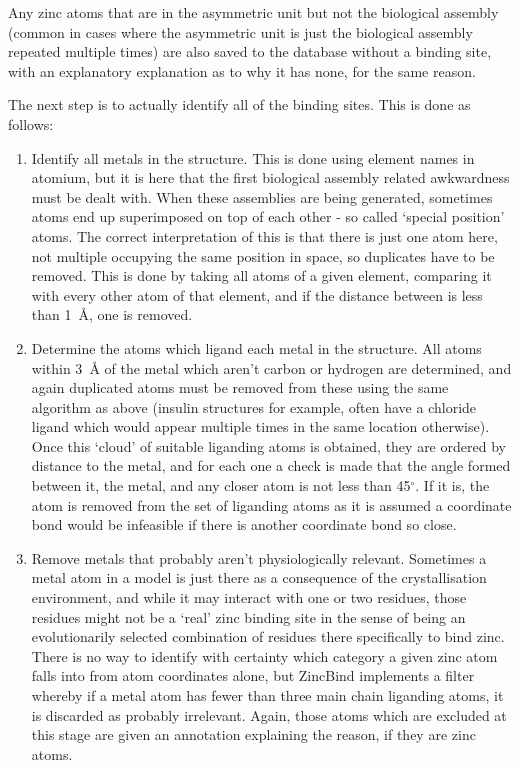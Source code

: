 Any zinc atoms that are in the asymmetric unit but not the biological assembly (common in cases where the asymmetric unit is just the biological assembly repeated multiple times) are also saved to the database without a binding site, with an explanatory explanation as to why it has none, for the same reason.

The next step is to actually identify all of the binding sites. This is done as follows:

\begin{enumerate}
   \item Identify all metals in the structure. This is done using element names in atomium, but it is here that the first biological assembly related awkwardness must be dealt with. When these assemblies are being generated, sometimes atoms end up superimposed on top of each other - so called `special position' atoms. The correct interpretation of this is that there is just one atom here, not multiple occupying the same position in space, so duplicates have to be removed. This is done by taking all atoms of a given element, comparing it with every other atom of that element, and if the distance between is less than 1~{\AA}, one is removed.
   \item Determine the atoms which ligand each metal in the structure. All atoms within 3~{\AA} of the metal which aren't carbon or hydrogen are determined, and again duplicated atoms must be removed from these using the same algorithm as above (insulin structures for example, often have a chloride ligand which would appear multiple times in the same location otherwise). Once this `cloud' of suitable liganding atoms is obtained, they are ordered by distance to the metal, and for each one a check is made that the angle formed between it, the metal, and any closer atom is not less than 45$^\circ$. If it is, the atom is removed from the set of liganding atoms as it is assumed a coordinate bond would be infeasible if there is another coordinate bond so close.
   \item Remove metals that probably aren't physiologically relevant. Sometimes a metal atom in a model is just there as a consequence of the crystallisation environment, and while it may interact with one or two residues, those residues might not be a `real' zinc binding site in the sense of being an evolutionarily selected combination of residues there specifically to bind zinc. There is no way to identify with certainty which category a given zinc atom falls into from atom coordinates alone, but ZincBind implements a filter whereby if a metal atom has fewer than three main chain liganding atoms, it is discarded as probably irrelevant. Again, those atoms which are excluded at this stage are given an annotation explaining the reason, if they are zinc atoms.

\end{enumerate}
